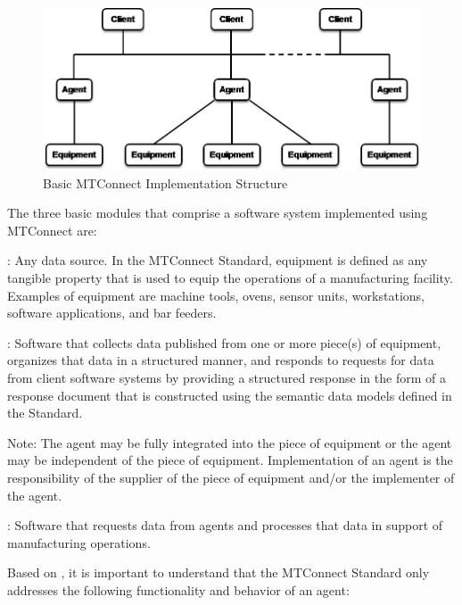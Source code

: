 \documentclass{mtconnect}	%
\begin{document}
\begin{figure}[ht]
  \centering
  \includegraphics[width=1.0\textwidth]{figures/basic-mtconnect-implementation-structure.png}
  \caption{Basic MTConnect Implementation Structure}
  \label{fig:basic-mtconnect-implementation-structure}
\end{figure}

\FloatBarrier

The three basic modules that comprise a software system implemented using MTConnect are:

:  Any data source.  In the MTConnect Standard, equipment is defined as any tangible property that is used to equip the operations of a manufacturing facility.  Examples of equipment are machine tools, ovens, sensor units, workstations, software applications, and bar feeders.

:  Software that collects data published from one or more piece(s) of equipment, organizes that data in a structured manner, and responds to requests for data from client software systems by providing a structured response in the form of a \gls{response document} that is constructed using the \glspl{semantic data model} defined in the Standard. 

\begin{note}
Note:	The \gls{agent} may be fully integrated into the piece of equipment or the \gls{agent} may be independent of the piece of equipment.  Implementation of an \gls{agent} is the responsibility of the supplier of the piece of equipment and/or the implementer of the \gls{agent}.
\end{note}

:  Software that requests data from \glspl{agent} and processes that data in support of manufacturing operations. 

Based on , it is important to understand that the MTConnect Standard only addresses the following functionality and behavior of an \gls{agent}:
\end{document}
